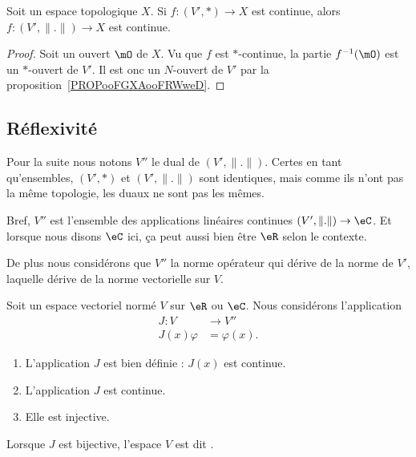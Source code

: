 \begin{corollary}
    Soit un espace topologique \( X\). Si \( f\colon (V',*)\to X\) est continue, alors \( f\colon (V',\| . \|)\to X\) est continue.
\end{corollary}

\begin{proof}
    Soit un ouvert \( \mO\) de \( X\). Vu que \( f\) est \( *\)-continue, la partie \( f^{-1}(\mO)\) est un \( *\)-ouvert de \( V'\). Il est onc un \( N\)-ouvert de \( V'\) par la proposition~\ref{PROPooFGXAooFRWweD}.
\end{proof}

\subsection{Réflexivité}

Pour la suite nous notons \( V''\) le dual de \( (V',\| . \|)\). Certes en tant qu'ensembles, \( (V',*)\) et \( (V',\| . \|) \) sont identiques, mais comme ils n'ont pas la même topologie, les duaux ne sont pas les mêmes.

Bref, \( V''\) est l'ensemble des applications linéaires continues \( (V',\| . \|)\to \eC\). Et lorsque nous disons \( \eC\) ici, ça peut aussi bien être \( \eR\) selon le contexte.

De plus nous considérons que \( V''\) la norme opérateur qui dérive de la norme de \( V'\), laquelle dérive de la norme vectorielle sur \( V\).

\begin{propositionDef}      \label{PROPooMAQSooCGFBBM}
    Soit un espace vectoriel normé $V$ sur $\eR$ ou $\eC$. Nous considérons l'application
    \begin{equation}
        \begin{aligned}
            J\colon V&\to V'' \\
            J(x)\varphi&= \varphi(x).
        \end{aligned}
    \end{equation}
    \begin{enumerate}
        \item       \label{ITEMooNVVSooNFXgnE}
            L'application \( J\) est bien définie : \( J(x)\) est continue.
        \item       \label{ITEMooKURHooZZWpbu}
            L'application \( J\) est continue.
        \item       \label{ITEMooTFYVooKhMOjp}
             Elle est injective.
    \end{enumerate}

    Lorsque \( J\) est bijective, l'espace \( V\) est dit .
\end{propositionDef}

